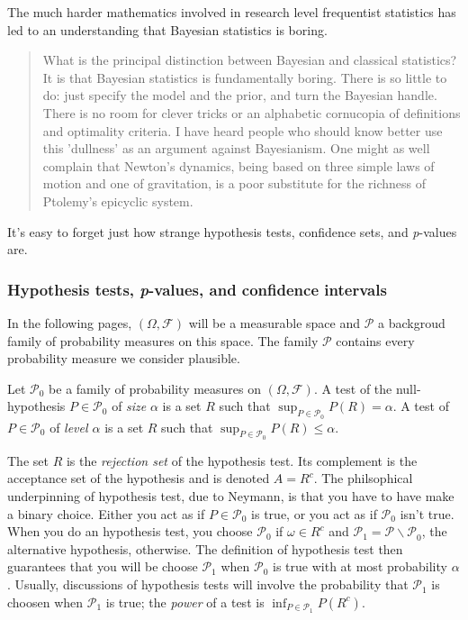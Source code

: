The much harder mathematics involved in research level frequentist
statistics has led to an understanding that Bayesian statistics is
boring. 
\begin{quote}
What is the principal distinction between Bayesian and classical statistics?
It is that Bayesian statistics is fundamentally boring. There is so
little to do: just specify the model and the prior, and turn the Bayesian
handle. There is no room for clever tricks or an alphabetic cornucopia
of definitions and optimality criteria. I have heard people who should
know better use this 'dullness' as an argument against Bayesianism.
One might as well complain that Newton's dynamics, being based on
three simple laws of motion and one of gravitation, is a poor substitute
for the richness of Ptolemy's epicyclic system. \parencite{Dawid2000-aw}
\end{quote}
It's easy to forget just how strange hypothesis tests, confidence
sets, and \emph{p}-values are. 

\subsubsection{Hypothesis tests, \emph{p}-values, and confidence intervals}

In the following pages, $(\Omega,\mathcal{\mathcal{F}})$ will be
a measurable space and $\mathcal{P}$ a backgroud family of probability
measures on this space. The family $\mathcal{P}$ contains every probability
measure we consider plausible. 
\begin{definition}
\parencite[][Chapter 3.1]{Lehmann2005-sp} Let $\mathcal{P}_{0}$ be a family
of probability measures on $(\Omega,\mathcal{F})$. A test of the
null-hypothesis $P\in\mathcal{P}_{0}$ of \emph{size} $\alpha$ is
a set $R$ such that $\sup_{P\in\mathcal{P}_{0}}P(R)=\alpha.$ A test
of $P\in\mathcal{P}_{0}$ of \emph{level $\alpha$ }is a set $R$
such that $\sup_{P\in\mathcal{P}_{0}}P(R)\leq\alpha.$
\end{definition}

The set $R$ is the \emph{rejection set} of the hypothesis test. Its
complement is the acceptance set of the hypothesis and is denoted
$A=R^{c}$. The philsophical underpinning of hypothesis test, due
to Neymann, is that you have to have make a binary choice. Either
you act as if $P\in\mathcal{P}_{0}$ is true, or you act as if $\mathcal{P}_{0}$
isn't true. When you do an hypothesis test, you choose $\mathcal{P}_{0}$
if $\omega\in R^{c}$ and $\mathcal{P}_{1}=\mathcal{P\backslash P}_{0}$,
the alternative hypothesis, otherwise. The definition of hypothesis
test then guarantees that you will be choose $\mathcal{P}_{1}$ when
$\mathcal{P}_{0}$ is true with at most probability $\alpha$. Usually,
discussions of hypothesis tests will involve the probability that
$\mathcal{P}_{1}$ is choosen when $\mathcal{P}_{1}$ is true; the
\emph{power} of a test is $\inf_{P\in\mathcal{P}_{1}}P(R^{c})$. \parencite{Neyman1977-nx}

